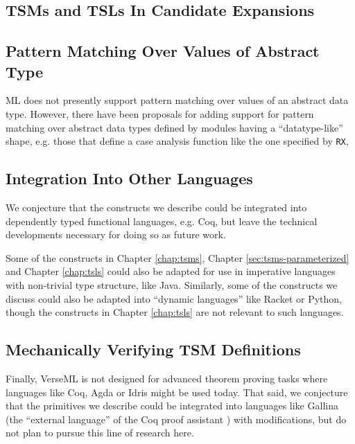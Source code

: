 {\subsection{TSMs and TSLs In Candidate Expansions}\label{sec:tsms-in-expansions}

\subsection{Pattern Matching Over Values of Abstract Type}\label{sec:patterns-for-abstract-types}
ML does not presently support pattern matching over values of an abstract data type. However, there have been proposals for adding support for pattern matching over abstract data types defined by modules having a ``datatype-like'' shape, e.g. those that define a case analysis function like the one specified by \lstinline{RX}, %


\subsection{Integration Into Other Languages}\label{sec:integration}
We conjecture that the constructs we describe could be integrated into dependently typed functional languages, e.g. Coq, but leave the technical developments necessary for doing so as future work.

Some of the constructs in Chapter \ref{chap:tsms}, Chapter \ref{sec:tsms-parameterized} and Chapter \ref{chap:tsls} could also be adapted for use in imperative languages with non-trivial type structure, like Java. Similarly, some of the constructs we discuss could also be adapted into ``{dynamic languages}'' like Racket or Python, though the constructs in Chapter \ref{chap:tsls} are not relevant to such languages. 


\subsection{Mechanically Verifying TSM Definitions}\label{sec:verifying-tsms}
Finally, VerseML is not designed for advanced theorem proving tasks where languages like Coq, Agda or Idris might be used today. That said, we conjecture that the primitives we describe could be integrated into languages like Gallina (the ``external language'' of the Coq proof assistant  \cite{Coq:manual}) with  modifications, but do not plan to pursue this line of research here.

}
